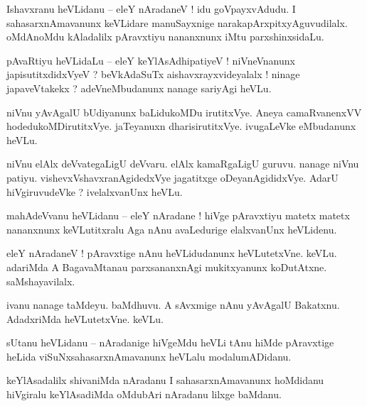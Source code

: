 \documentclass{article}
\begin{document}
\begin{mn}%
Ishavxranu heVLidanu -- eleY nAradaneV ! idu goVpayxvAdudu. I sahasarxnAmavanunx keVLidare 
manuSayxnige narakapArxpitxyAguvudilalx. oMdAnoMdu kAladalilx pAravxtiyu nananxnunx iMtu 
parxshinxsidaLu.
\end{mn}

\begin{mn}%
pAvaRtiyu heVLidaLu -- eleY keYlAsAdhipatiyeV ! niVneVnanunx japisutitxdidxVyeV ? beVkAdaSuTx 
aishavxrayxvideyalalx ! ninage japaveVtakekx ? adeVneMbudanunx nanage sariyAgi heVLu.
\end{mn}

\begin{mn}%
niVnu yAvAgalU bUdiyanunx baLidukoMDu irutitxVye. Aneya camaRvanenxVV hodedukoMDirutitxVye. 
jaTeyanuxn dharisirutitxVye. ivugaLeVke eMbudanunx heVLu.
\end{mn}

\begin{mn}%
niVnu elAlx deVvategaLigU deVvaru. elAlx kamaRgaLigU guruvu. nanage niVnu patiyu. 
vishevxVshavxranAgidedxVye jagatitxge oDeyanAgididxVye. AdarU hiVgiruvudeVke ? ivelalxvanUnx heVLu.
\end{mn}

\begin{mn}%
mahAdeVvanu heVLidanu -- eleY nAradane ! hiVge pAravxtiyu matetx matetx nananxnunx keVLutitxralu 
Aga nAnu avaLedurige elalxvanUnx heVLidenu.
\end{mn}

\begin{mn}%
eleY nAradaneV ! pAravxtige nAnu heVLidudanunx heVLutetxVne. keVLu. adariMda A BagavaMtanau 
parxsananxnAgi mukitxyanunx koDutAtxne. saMshayavilalx.
\end{mn}

\begin{mn}%
ivanu nanage taMdeyu. baMdhuvu. A sAvxmige nAnu yAvAgalU Bakatxnu. AdadxriMda heVLutetxVne. keVLu.
\end{mn}

\begin{mn}%
sUtanu heVLidanu -- nAradanige hiVgeMdu heVLi tAnu hiMde pAravxtige heLida viSuNxsahasarxnAmavanunx 
heVLalu modalumADidanu.
\end{mn}

\begin{mn}%
keYlAsadalilx shivaniMda nAradanu I sahasarxnAmavanunx hoMdidanu hiVgiralu keYlAsadiMda oMdubAri 
nAradanu lilxge baMdanu.
\end{mn}
\end{document}
